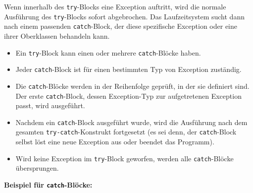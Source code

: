 Wenn innerhalb des \texttt{try}-Blocks eine Exception auftritt, wird die
normale Ausführung des \texttt{try}-Blocks sofort abgebrochen. Das
Laufzeitsystem sucht dann nach einem passenden \texttt{catch}-Block, der diese
spezifische Exception oder eine ihrer Oberklassen behandeln kann.

\begin{itemize}
    \item Ein \texttt{try}-Block kann einen oder mehrere \texttt{catch}-Blöcke haben.
    \item Jeder \texttt{catch}-Block ist für einen bestimmten Typ von Exception
          zuständig.
    \item Die \texttt{catch}-Blöcke werden in der Reihenfolge geprüft, in der sie
          definiert sind. Der erste \texttt{catch}-Block, dessen Exception-Typ zur
          aufgetretenen Exception passt, wird ausgeführt.
    \item Nachdem ein \texttt{catch}-Block ausgeführt wurde, wird die Ausführung nach dem
          gesamten \texttt{try-catch}-Konstrukt fortgesetzt (es sei denn, der
          \texttt{catch}-Block selbst löst eine neue Exception aus oder beendet das
          Programm).
    \item Wird keine Exception im \texttt{try}-Block geworfen, werden alle
          \texttt{catch}-Blöcke übersprungen.
\end{itemize}

\textbf{Beispiel für \texttt{catch}-Blöcke:}

